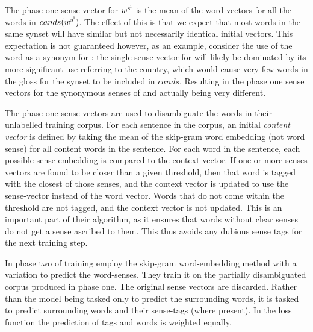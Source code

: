 \documentclass[12pt,parskip]{komatufte}
\begin{document}
The phase one sense vector for $\d w_{\n s_i}$ is the mean of the word vectors for all the words in $cands(\d w_{\n s_{i}})$.
The effect of this is that we expect that most words in the same synset will have similar but not necessarily identical initial vectors.
This expectation is not guaranteed however, as an example, consider the use of the word  as a synonym for : the single sense vector for  will likely be dominated by its more significant use referring to the country, which would cause very few words in the gloss for the  synset to be included in $cands$. Resulting in the phase one sense vectors for the synonymous senses of  and  actually being very different.


The phase one sense vectors are used to disambiguate the words in their unlabelled training corpus.
For each sentence in the corpus, an initial\emph{ content vector} is defined by taking the mean of the skip-gram word embedding (not word sense) for all content words in the sentence.
For each word in the sentence, each possible sense-embedding is compared to the context vector.
If one or more senses vectors are found to be closer than a given threshold,
then that word is tagged with the closest of those senses,
 and the context vector is updated to use the sense-vector instead of the word vector.
Words that do not come within the threshold are not tagged, and the context vector is not updated.
This is an important part of their algorithm, as it ensures that words without clear senses do not get a sense ascribed to them.
This thus avoids any dubious sense tags for the next training step.

In phase two of training
\textcite{Chen2014} employ the skip-gram word-embedding method with a variation to predict the word-senses.
They train it on the partially disambiguated corpus produced in phase one.
The original sense vectors are discarded.
Rather than the model being tasked only to predict the surrounding words, it is tasked to predict surrounding words and their sense-tags (where present).
In the loss function the prediction of tags and words is weighted equally.
\end{document}
